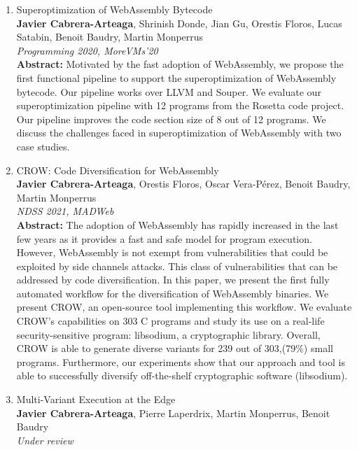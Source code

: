 \begin{enumerate}[label=\subscript{P}{{\arabic*}}]
    \item Superoptimization of WebAssembly Bytecode \cite{WasmSuperoptimizer}\\
    {\small\textbf{Javier Cabrera-Arteaga}, Shrinish Donde, Jian Gu, Orestis Floros, Lucas Satabin, Benoit Baudry, Martin Monperrus}\\
        \emph{Programming 2020, MoreVMs'20}\\
        {\small
        \textbf{Abstract:} Motivated by the fast adoption of WebAssembly, we propose the first functional pipeline to support the superoptimization of WebAssembly bytecode. Our pipeline works over LLVM and Souper. We evaluate our superoptimization pipeline with 12 programs from the Rosetta code project. Our pipeline improves the code section size of 8 out of 12 programs. We discuss the challenges faced in superoptimization of WebAssembly with two case studies.}
    \item CROW: Code Diversification for WebAssembly \cite{CROW}\\
    {\small\textbf{Javier Cabrera-Arteaga}, Orestis Floros, Oscar Vera-Pérez, Benoit Baudry,  Martin Monperrus}\\
    \emph{NDSS 2021, MADWeb}\\
    {\small
    \textbf{Abstract:} The adoption of WebAssembly has rapidly increased in the last few years as it provides a fast and safe model for program execution. However, WebAssembly is not exempt from vulnerabilities that could be exploited by side channels attacks. This class of vulnerabilities that can be addressed by code diversification. In this paper, we present the first fully automated workflow for the diversification of WebAssembly binaries. We present CROW, an open-source tool implementing this workflow. We evaluate CROW's capabilities on 303 C programs and study its use on a real-life security-sensitive program: libsodium, a cryptographic library. Overall, CROW is able to generate diverse variants for 239 out of 303,(79\%) small programs. Furthermore, our experiments show that our approach and tool is able to successfully diversify off-the-shelf cryptographic software (libsodium).}
    \item Multi-Variant Execution at the Edge \cite{MEWE}\\
    {\small\textbf{Javier Cabrera-Arteaga}, Pierre Laperdrix, Martin Monperrus, Benoit Baudry}\\
    \emph{Under review}\\

\end{enumerate}
